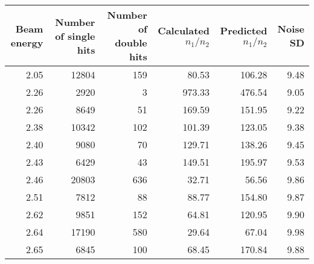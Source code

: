 \begin{tabular}{rrrrrr}
\toprule
Beam energy & Number of single hits & Number of double hits & Calculated $n_1/n_2$ & Predicted $n_1/n_2$ & Noise SD \\
\midrule
2.05 & 12804 & 159 & 80.53 & 106.28 & 9.48 \\
2.26 & 2920 & 3 & 973.33 & 476.54 & 9.05 \\
2.26 & 8649 & 51 & 169.59 & 151.95 & 9.22 \\
2.38 & 10342 & 102 & 101.39 & 123.05 & 9.38 \\
2.40 & 9080 & 70 & 129.71 & 138.26 & 9.45 \\
2.43 & 6429 & 43 & 149.51 & 195.97 & 9.53 \\
2.46 & 20803 & 636 & 32.71 & 56.56 & 9.86 \\
2.51 & 7812 & 88 & 88.77 & 154.80 & 9.87 \\
2.62 & 9851 & 152 & 64.81 & 120.95 & 9.90 \\
2.64 & 17190 & 580 & 29.64 & 67.04 & 9.98 \\
2.65 & 6845 & 100 & 68.45 & 170.84 & 9.88 \\
\bottomrule
\end{tabular}
